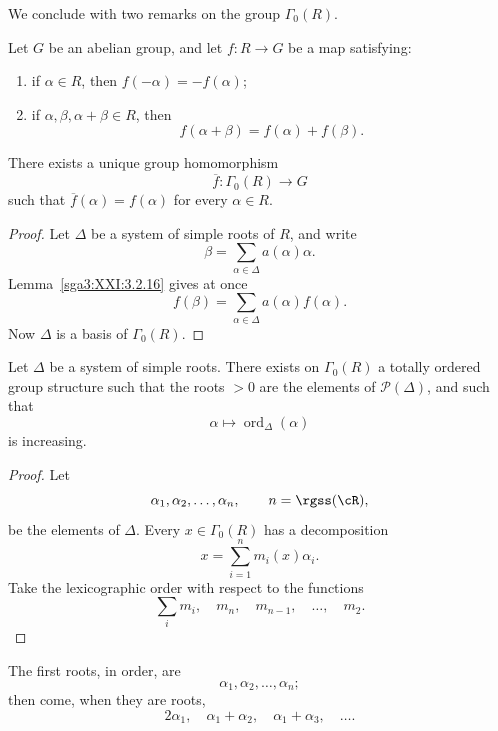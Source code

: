 We conclude with two remarks on the group \(\Gamma_0(R)\).

\begin{proposition}\label{sga3:XXI:3.5.5}
Let \(G\) be an abelian group, and let \(f:R\to G\) be a map
satisfying:
\begin{enumerate}
\item[(i)] if \(\alpha\in R\), then
  \(f(-\alpha)=-f(\alpha)\);
\item[(ii)] if \(\alpha,\beta,\alpha+\beta\in R\), then
  \[
   f(\alpha+\beta)=f(\alpha)+f(\beta).
  \]
\end{enumerate}
There exists a unique group homomorphism
\[
 \overline f:\Gamma_0(R)\longrightarrow G
\]
such that \(\overline f(\alpha)=f(\alpha)\) for every
\(\alpha\in R\).
\end{proposition}

\begin{proof}
Let \(\Delta\) be a system of simple roots of \(R\), and write
\[
 \beta=\sum_{\alpha\in\Delta}a(\alpha)\alpha.
\]
Lemma~\ref{sga3:XXI:3.2.16} gives at once
\[
 f(\beta)=\sum_{\alpha\in\Delta}a(\alpha)f(\alpha).
\]
Now \(\Delta\) is a basis of \(\Gamma_0(R)\).
\end{proof}

\begin{proposition}\label{sga3:XXI:3.5.6}
Let \(\Delta\) be a system of simple roots. There exists on
\(\Gamma_0(R)\) a totally ordered group structure such that the roots
\(>0\) are the elements of \(\mathscr{P}(\Delta)\), and such that
\[
 \alpha\longmapsto\operatorname{ord}_\Delta(\alpha)
\]
is increasing.
\end{proposition}

\begin{proof}
Let
\[
 \alpha_1,\alpha_2,\ldots,\alpha_n,
 \qquad n=\rgss(\cR),
\]
be the elements of \(\Delta\). Every \(x\in\Gamma_0(R)\) has a
decomposition
\[
 x=\sum_{i=1}^{n}m_i(x)\alpha_i.
\]
Take the lexicographic order with respect to the functions
\[
 \sum_i m_i,\quad m_n,\quad m_{n-1},\quad\ldots,\quad m_2.
\]
\end{proof}

\begin{remark}\label{sga3:XXI:3.5.7}
The first roots, in order, are
\[
 \alpha_1,\alpha_2,\ldots,\alpha_n;
\]
then come, when they are roots,
\[
 2\alpha_1,\quad
 \alpha_1+\alpha_2,\quad
 \alpha_1+\alpha_3,\quad\ldots.
\]
\end{remark}

